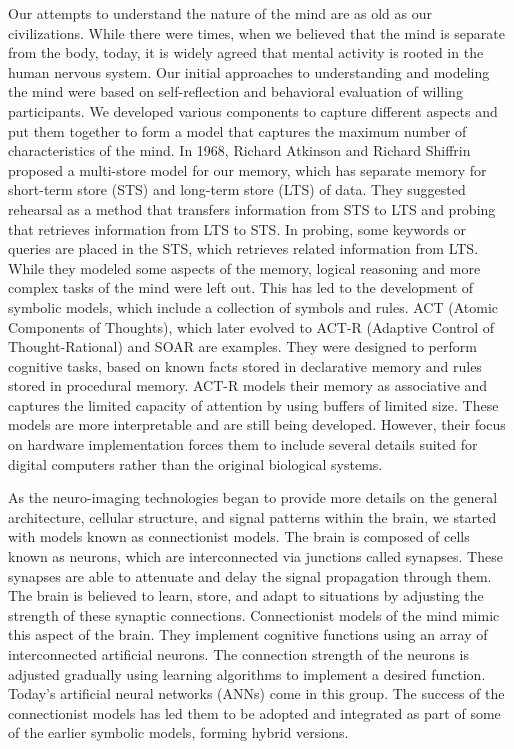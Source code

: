 \documentclass[reprint,amsmath,amssymb,apr,aip,onecolumn, 11pt]{revtex4-1}
\begin{document}
	
	Our attempts to understand the nature of the mind are as old as our civilizations. While there were times, when we believed that the mind is separate from the body, today, it is widely agreed that mental activity is rooted in the human nervous system. Our initial approaches to understanding and modeling the mind were based on self-reflection and behavioral evaluation of willing participants. We developed various components to capture different aspects and put them together to form a model that captures the maximum number of characteristics of the mind.  In 1968, Richard Atkinson and Richard Shiffrin proposed a multi-store model for our memory, which has separate memory for short-term store (STS) and long-term store (LTS) of data\cite{ATKINSON1968, Atkinson_1971}. They suggested rehearsal as a method that transfers information from STS to LTS and probing that retrieves information from LTS to STS. In probing, some keywords or queries are placed in the STS, which retrieves related information from LTS. While they modeled some aspects of the memory,  logical reasoning and more complex tasks of the mind were left out. This has led to the development of symbolic models, which include a collection of symbols and rules. ACT (Atomic Components of Thoughts), which later evolved to ACT-R (Adaptive Control of Thought-Rational)\cite{Anderson_1974, Anderson_1998}  and SOAR\cite{Newell_1990} are examples. They were designed to perform cognitive tasks, based on known facts stored in declarative memory and rules stored in procedural memory. ACT-R models their memory as associative and captures the limited capacity of attention by using buffers of limited size.  These models are more interpretable and are still being developed. However, their focus on hardware implementation forces them to include several details suited for digital computers rather than the original biological systems. 
	
	As the neuro-imaging technologies began to provide more details on the general architecture,  cellular structure, and signal patterns within the brain, we started with models known as connectionist models.  The brain is composed of cells known as neurons, which are interconnected via junctions called synapses. These synapses are able to attenuate and delay the signal propagation through them. The brain is believed to learn, store, and adapt to situations by adjusting the strength of these synaptic connections. Connectionist models of the mind mimic this aspect of the brain. They implement cognitive functions using an array of interconnected artificial neurons. The connection strength of the neurons is adjusted gradually using learning algorithms to implement a desired function. Today's artificial neural networks (ANNs) come in this group. The success of the connectionist models has led them to be adopted and integrated as part of some of the earlier symbolic models, forming hybrid versions.
	
\end{document}
